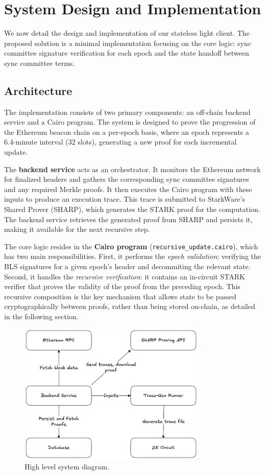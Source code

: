 \documentclass[runningheads]{llncs}
\begin{document}
\section{System Design and Implementation}
\label{section:implementation}
We now detail the design and implementation of our stateless light client. The proposed solution is a minimal implementation focusing on the core logic: sync committee signature verification for each epoch and the state handoff between sync committee terms.

\subsection{Architecture}
The implementation consists of two primary components: an off-chain backend service and a Cairo program. The system is designed to prove the progression of the Ethereum beacon chain on a per-epoch basis, where an epoch represents a 6.4-minute interval (32 slots), generating a new proof for each incremental update.

The \textbf{backend service} acts as an orchestrator. It monitors the Ethereum network for finalized headers and gathers the corresponding sync committee signatures and any required Merkle proofs. It then executes the Cairo program with these inputs to produce an execution trace. This trace is submitted to StarkWare's Shared Prover (SHARP), which generates the STARK proof for the computation. The backend service retrieves the generated proof from SHARP and persists it, making it available for the next recursive step.

The core logic resides in the \textbf{Cairo program} (\texttt{recursive\_update.cairo}), which has two main responsibilities. First, it performs the \textit{epoch validation}: verifying the BLS signatures for a given epoch's header and decommiting the relevant state. Second, it handles the \textit{recursive verification}: it contains an in-circuit STARK verifier that proves the validity of the proof from the preceding epoch. This recursive composition is the key mechanism that allows state to be passed cryptographically between proofs, rather than being stored on-chain, as detailed in the following section.

\begin{figure}
    \centering
    \includegraphics[width=0.8\textwidth]{diagrams/high_level.png}
    \caption{High level system diagram.}
    \label{fig:high_level}
\end{figure}
\end{document}
